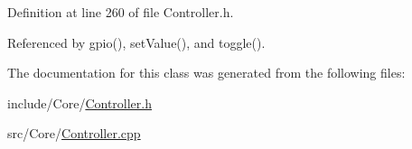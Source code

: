 Definition at line 260 of file Controller.\+h.



Referenced by gpio(), set\+Value(), and toggle().



The documentation for this class was generated from the following files\+:\begin{DoxyCompactItemize}
\item 
include/\+Core/\hyperlink{_controller_8h}{Controller.\+h}\item 
src/\+Core/\hyperlink{_controller_8cpp}{Controller.\+cpp}\end{DoxyCompactItemize}
